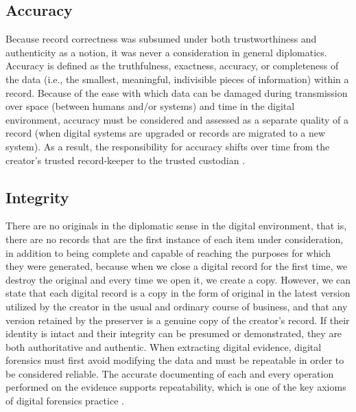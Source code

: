 \subsection{Accuracy}
Because record correctness was subsumed under both trustworthiness and authenticity as a notion, it was never a consideration in general diplomatics. Accuracy is defined as the truthfulness, exactness, accuracy, or completeness of the data (i.e., the smallest, meaningful, indivisible pieces of information) within a record. Because of the ease with which data can be damaged during transmission over space (between humans and/or systems) and time in the digital environment, accuracy must be considered and assessed as a separate quality of a record (when digital systems are upgraded or records are migrated to a new system). As a result, the responsibility for accuracy shifts over time from the creator's trusted record-keeper to the trusted custodian \cite[14]{kirschenbaum2010digital}.

\subsection{Integrity}
There are no originals in the diplomatic sense in the digital environment, that is, there are no records that are the first instance of each item under consideration, in addition to being complete and capable of reaching the purposes for which they were generated, because when we close a digital record for the first time, we destroy the original and every time we open it, we create a copy. However, we can state that each digital record is a copy in the form of original in the latest version utilized by the creator in the usual and ordinary course of business, and that any version retained by the preserver is a genuine copy of the creator's record.
If their identity is intact and their integrity can be presumed or demonstrated, they are both authoritative and authentic. When extracting digital evidence, digital forensics must first avoid modifying the data and must be repeatable in order to be considered reliable. The accurate documenting of each and every operation performed on the evidence supports repeatability, which is one of the key axioms of digital forensics practice \cite[58]{duranti2009digital}. 


